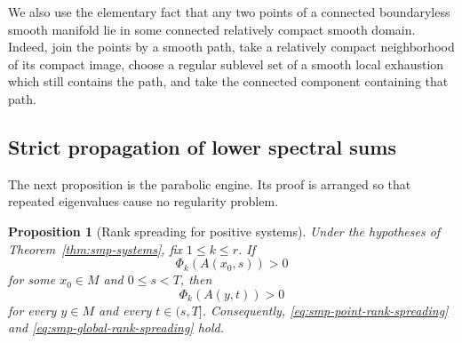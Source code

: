 \documentclass[10pt]{coll-l}
\newtheorem{proposition}[theorem]{Proposition}
\theoremstyle{definition}
\theoremstyle{remark}
\numberwithin{section}{chapter}
\numberwithin{equation}{chapter}
\begin{document}
We also use the elementary fact that any two points of a connected
boundaryless smooth manifold lie in some connected relatively compact
smooth domain.  Indeed, join the points by a smooth path, take a relatively
compact neighborhood of its compact image, choose a regular sublevel set
of a smooth local exhaustion which still contains the path, and take the
connected component containing that path.

\subsection{Strict propagation of lower spectral sums}
\label{subsec:smp-rank-spreading}

The next proposition is the parabolic engine.  Its proof is arranged so
that repeated eigenvalues cause no regularity problem.

\begin{proposition}[Rank spreading for positive systems]
\label{prop:smp-rank-spreading}
Under the hypotheses of Theorem~\ref{thm:smp-systems}, fix
$1\leq k\leq r$.  If
\begin{equation}
                   \Phi_k(A(x_0,s))>0                    \label{eq:smp-positive-phi-start}
\end{equation}
for some $x_0\in M$ and $0\leq s<T$, then
\begin{equation}
                   \Phi_k(A(y,t))>0                      \label{eq:smp-positive-phi-later}
\end{equation}
for every $y\in M$ and every $t\in(s,T]$.
Consequently, \eqref{eq:smp-point-rank-spreading} and
\eqref{eq:smp-global-rank-spreading} hold.
\end{proposition}
\end{document}
